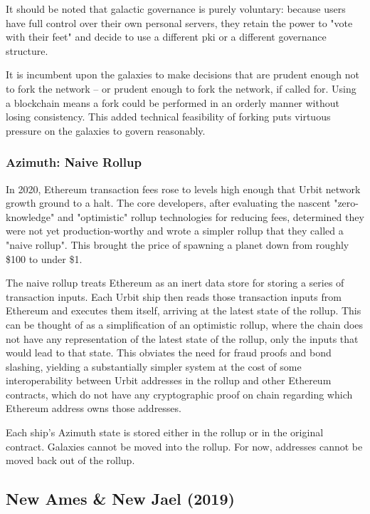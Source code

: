 \documentclass[twoside]{article}
\begin{document}
It should be noted that galactic governance is purely voluntary: because users have full control over their own personal servers, they retain the power to "vote with their feet" and decide to use a different {\sc pki} or a different governance structure.

It is incumbent upon the galaxies to make decisions that are prudent enough not to fork the network – or prudent enough to fork the network, if called for.  Using a blockchain means a fork could be performed in an orderly manner without losing consistency.  This added technical feasibility of forking puts virtuous pressure on the galaxies to govern reasonably.

\subsubsection{Azimuth: Naive Rollup}

In 2020, Ethereum transaction fees rose to levels high enough that Urbit network growth ground to a halt.  The core developers, after evaluating the nascent "zero-knowledge" and "optimistic" rollup technologies for reducing fees, determined they were not yet production-worthy and wrote a simpler rollup that they called a "naive rollup".  This brought the price of spawning a planet down from roughly \$100 to under \$1.

The naive rollup treats Ethereum as an inert data store for storing a series of transaction inputs.  Each Urbit ship then reads those transaction inputs from Ethereum and executes them itself, arriving at the latest state of the rollup.  This can be thought of as a simplification of an optimistic rollup, where the chain does not have any representation of the latest state of the rollup, only the inputs that would lead to that state.  This obviates the need for fraud proofs and bond slashing, yielding a substantially simpler system at the cost of some interoperability between Urbit addresses in the rollup and other Ethereum contracts, which do not have any cryptographic proof on chain regarding which Ethereum address owns those addresses.

Each ship's Azimuth state is stored either in the rollup or in the original contract.  Galaxies cannot be moved into the rollup.  For now, addresses cannot be moved back out of the rollup.

\subsection{New Ames & New Jael (2019)}
\end{document}
